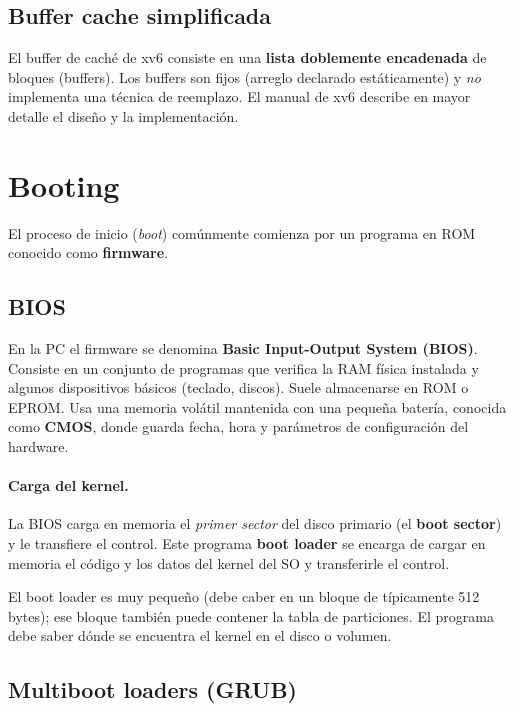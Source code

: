 \documentclass[11pt,a4paper]{article}
\begin{document}
\subsection{Buffer cache simplificada}

El buffer de caché de xv6 consiste en una \textbf{lista doblemente
encadenada} de bloques (buffers). Los buffers son fijos (arreglo
declarado estáticamente) y \emph{no} implementa una técnica de
reemplazo. El manual de xv6 describe en mayor detalle el diseño y la
implementación.

\section{Booting}

El proceso de inicio (\emph{boot}) comúnmente comienza por un programa
en ROM conocido como \textbf{firmware}.

\subsection{BIOS}

En la PC el firmware se denomina \textbf{Basic Input-Output System
(BIOS)}. Consiste en un conjunto de programas que verifica la RAM
física instalada y algunos dispositivos básicos (teclado, discos).
Suele almacenarse en ROM o EPROM. Usa una memoria volátil mantenida
con una pequeña batería, conocida como \textbf{CMOS}, donde guarda
fecha, hora y parámetros de configuración del hardware.

\paragraph{Carga del kernel.}
La BIOS carga en memoria el \emph{primer sector} del disco primario
(el \textbf{boot sector}) y le transfiere el control. Este programa
\textbf{boot loader} se encarga de cargar en memoria el código y los
datos del kernel del SO y transferirle el control.

El boot loader es muy pequeño (debe caber en un bloque de típicamente
512\,bytes); ese bloque también puede contener la tabla de particiones.
El programa debe saber dónde se encuentra el kernel en el disco o
volumen.

\subsection{Multiboot loaders (GRUB)}
\end{document}
